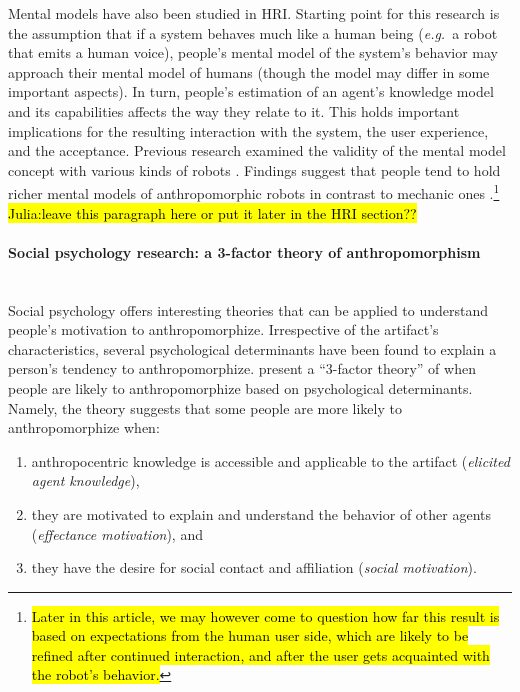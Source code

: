 \documentclass{frontiersSCNS} %
\newcommand{\eg}{{\textit{e.g.~}}}
\begin{document}
Mental models have also been studied in HRI. Starting point for this research is the assumption that if a system behaves much like a human being (\eg a robot that emits a human voice), people's mental model of the system's behavior may approach their mental model of humans (though the model may differ in some important aspects). In turn, people's estimation of an agent's knowledge model and its capabilities affects the way they relate to it. This holds important implications for the resulting interaction with the system, the user experience, and the acceptance. Previous research examined the validity of the mental model concept with various kinds of robots \cite{schmitz_concepts_2011,kiesler_mental_2002}. Findings suggest that people tend to hold richer mental models of anthropomorphic robots in contrast to mechanic ones \cite{kiesler_mental_2002}.\footnote{\hl{Later in this article, we may however come to question how far this result is based on expectations from the human user side, which are likely to be refined after continued interaction, and after the user gets acquainted with the robot's behavior.}} \hl{Julia:leave this paragraph here or put it later in the HRI section??}


\paragraph*{Social psychology research: a 3-factor theory of anthropomorphism\\ \\}
\label{sec:psychological-factors}

Social psychology offers interesting theories that can be applied to understand people's motivation to anthropomorphize. Irrespective of the artifact's characteristics, several psychological determinants have been found to explain a person's tendency to anthropomorphize. \cite{epley_seeing_2007} present a ``3-factor theory'' of when people are likely to anthropomorphize based on psychological determinants. Namely, the theory suggests that some people are more likely to anthropomorphize when: 

\begin{enumerate}
	\item anthropocentric knowledge is accessible and applicable to the artifact (\textit{elicited agent knowledge}),
	\item they are motivated to explain and understand the behavior of other agents (\textit{effectance motivation}), and
	\item they have the desire for social contact and affiliation (\textit{social motivation}).
\end{enumerate}
\end{document}
